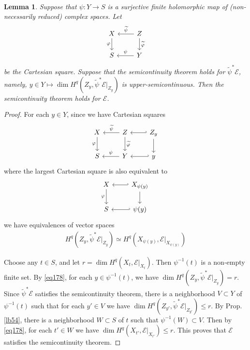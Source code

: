 \documentclass[12pt,b5paper,notitlepage]{report}
\theoremstyle{definition}
\theoremstyle{plain}
\newtheorem{lm}[df]{Lemma}
\newcommand{\wtd}{\widetilde}
\newcommand{\scr}{\mathscr}
\numberwithin{equation}{section}
\begin{document}
\begin{lm}\label{lb353}
Suppose that $\psi:Y\rightarrow S$ is a surjective finite holomorphic map of (non-necessarily reduced) complex spaces. Let
\begin{equation*}
\begin{tikzcd}
X \arrow[d, "\varphi"'] & Z \arrow[l, "\wtd\psi"'] \arrow[d, "\wtd\varphi"] \\
S                       & Y \arrow[l, "\psi"']                             
\end{tikzcd}
\end{equation*}
be the Cartesian square. Suppose that the semicontinuity theorem holds for $\wtd\psi^*\scr E$, namely, $y\in Y\mapsto \dim H^q(Z_y,\wtd\psi^*\scr E|_{Z_y})$ is upper-semicontinuous. Then the semicontinuity theorem holds for $\scr E$.
\end{lm}


\begin{proof}
For each $y\in Y$, since we have Cartesian squares
\begin{equation*}
\begin{tikzcd}
X \arrow[d, "\varphi"'] & Z \arrow[l, "\wtd\psi"'] \arrow[d, "\wtd\varphi"] & Z_y \arrow[d] \arrow[l,hook'] \\
S                       & Y \arrow[l, "\psi"']   &y \arrow[l,hook']                          
\end{tikzcd}
\end{equation*}
where the largest Cartesian square is also equivalent to
\begin{equation*}
\begin{tikzcd}
X \arrow[d, "\varphi"'] & X_{\psi(y)} \arrow[l, hook'] \arrow[d] \\
S                       & \psi(y) \arrow[l, hook']          
\end{tikzcd}
\end{equation*}
we have equivalences of vector spaces
\begin{align}
H^q(Z_y,\wtd\psi^*\scr E|_{Z_y})\simeq H^q(X_{\psi(y)},\scr E|_{X_{\psi(y)}})\label{eq178}
\end{align}

Choose any $t\in S$, and let $r=\dim H^q(X_t,\scr E|_{X_t})$. Then $\psi^{-1}(t)$ is a non-empty finite set. By \eqref{eq178}, for each $y\in\psi^{-1}(t)$, we have $\dim H^q(Z_y,\wtd\psi^*\scr E|_{Z_y})=r$. Since $\wtd\psi^*\scr E$ satisfies the semicontinuity theorem, there is a neighborhood $V\subset Y$ of $\psi^{-1}(t)$ such that for each $y'\in V$ we have $\dim H^q(Z_{y'},\wtd\psi^*\scr E|_{Z_{y'}})\leq r$. By Prop. \ref{lb54}, there is a neighborhood $W\subset S$ of $t$ such that $\psi^{-1}(W)\subset V$. Then by \eqref{eq178}, for each $t'\in W$ we have $\dim H^q(X_{t'},\scr E|_{X_{t'}})\leq r$. This proves that $\scr E$ satisfies the semicontinuity theorem.
\end{proof}
\end{document}
